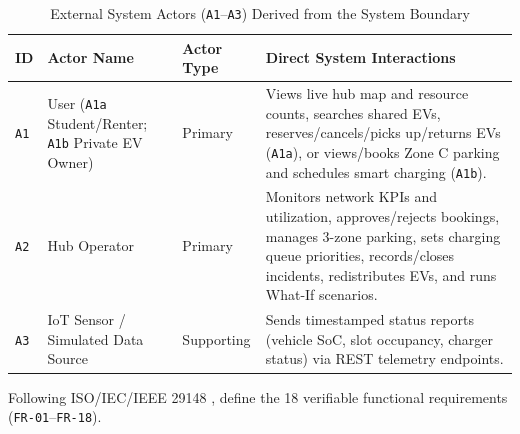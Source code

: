 \begin{table}[H]
  \centering
  \singlespacing\footnotesize
  \caption{External System Actors (\texttt{A1}--\texttt{A3}) Derived from the System Boundary}
  \label{tab:actors}
  \renewcommand{\arraystretch}{1.24}
  \begin{tabularx}{\textwidth}{|C{1.1cm}|L{3.4cm}|C{2.1cm}|Y|}
    \hline
    \textbf{ID} & \textbf{Actor Name} & \textbf{Actor Type} & \textbf{Direct System Interactions} \\
    \hline
    \texttt{A1} & User (\texttt{A1a} Student/Renter; \texttt{A1b} Private EV Owner) & Primary & Views live hub map and resource counts, searches shared EVs, reserves/cancels/picks up/returns EVs (\texttt{A1a}), or views/books Zone C parking and schedules smart charging (\texttt{A1b}). \\
    \hline
    \texttt{A2} & Hub Operator & Primary & Monitors network KPIs and utilization, approves/rejects bookings, manages 3-zone parking, sets charging queue priorities, records/closes incidents, redistributes EVs, and runs What-If scenarios. \\
    \hline
    \texttt{A3} & IoT Sensor / Simulated Data Source & Supporting & Sends timestamped status reports (vehicle SoC, slot occupancy, charger status) via REST telemetry endpoints. \\
    \hline
  \end{tabularx}
\end{table}

\label{subsec:functional-requirements}
Following ISO/IEC/IEEE 29148 \cite{iso29148},  define the 18 verifiable functional requirements (\texttt{FR-01}--\texttt{FR-18}).

